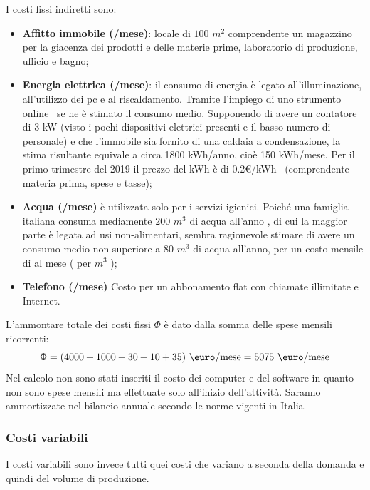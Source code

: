 %
I costi fissi indiretti sono: 
\begin{itemize}
\item \textbf{Affitto immobile (/mese)}: locale di $100$ $m^2$
comprendente un magazzino per la giacenza dei prodotti e delle materie
prime, laboratorio di produzione, ufficio e bagno;
\item \textbf{Energia elettrica (/mese)}: il consumo di energia è
legato all’illuminazione, all’utilizzo dei pc e al riscaldamento. Tramite
l’impiego di uno strumento online~\cite{lucegas} se ne è stimato il consumo
medio. Supponendo di avere un contatore di 3 kW (visto i pochi dispositivi
elettrici presenti e il basso numero di personale) e che l’immobile sia fornito
di una caldaia a condensazione, la stima risultante equivale a circa 1800
kWh/anno, cioè 150 kWh/mese. Per il primo trimestre del 2019 il prezzo del kWh è
di 0.2\euro/kWh~\cite{segugio} (comprendente materia prima, spese e tasse);

\item \textbf{Acqua (/mese)}  è utilizzata solo per i servizi igienici.
Poiché una famiglia italiana consuma mediamente $200$ $m^3$ di acqua all’anno
\cite{acqua}, di cui la maggior parte è legata ad usi non-alimentari, sembra
ragionevole stimare di avere un consumo medio non superiore a $80$ $m^3$ di acqua
all’anno, per un costo mensile di  al mese ( per $m^3$
\cite{acquacub});

\item \textbf{Telefono (/mese)} Costo per un abbonamento flat \cite{tim}
con chiamate illimitate e Internet.

\end{itemize}
%

L’ammontare totale dei costi fissi $\Phi$ è dato dalla somma delle spese mensili
ricorrenti:
\begin{displaymath}
\Phi = (4000 + 1000 + 30 + 10 + 35) \ \mbox{\euro/mese} = 5075 \ 
\mbox{\euro/mese}
\end{displaymath}
Nel calcolo non sono stati inseriti il costo dei computer e del software in
quanto non sono spese mensili ma effettuate solo all’inizio dell’attività.
Saranno ammortizzate nel bilancio annuale secondo le norme vigenti in Italia.
%
\subsubsection{Costi variabili}
I costi variabili sono invece tutti quei costi che variano a seconda della
domanda e quindi del volume di produzione.

